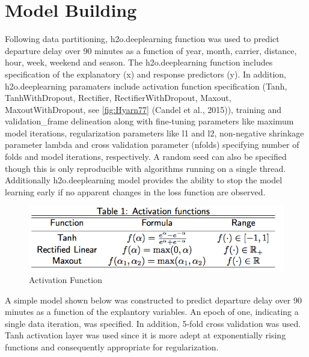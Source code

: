 \documentclass[12pt,twoside]{amherstthesis}
\begin{document}
  \clearpage 
  
  \section{Model Building}\label{model-building}
  
  Following data partitioning, h2o.deeplearning function was used to
  predict departure delay over 90 minutes as a function of year, month,
  carrier, distance, hour, week, weekend and season. The h2o.deeplearning
  function includes specification of the explanatory (x) and response
  predictors (y). In addition, h2o.deeplearning paramaters include
  activation function specification (Tanh, TanhWithDropout, Rectifier,
  RectifierWithDropout, Maxout, MaxoutWithDropout, see
  \autoref{fig:Hyarn77} (Candel et al., 2015)), training and
  validation\_frame delineation along with fine-tuning parameters like
  maximum model iterations, regularization parameters like l1 and l2,
  non-negative shrinkage parameter lambda and cross validation parameter
  (nfolds) specifying number of folds and model iterations, respectively.
  A random seed can also be specified though this is only reproducible
  with algorithms running on a single thread. Additionally
  h2o.deeplearning model provides the ability to stop the model learning
  early if no apparent changes in the loss function are observed.
  
  \begin{figure}[htbp]
  \centering
  \includegraphics[scale = 0.5,angle = 0]{figure/activationFunc.png}
  \caption[Activation Function]{\normalsize{Activation Function}}
  \label{fig:Hyarn77}
  \end{figure}
  
  A simple model shown below was constructed to predict departure delay
  over 90 minutes as a function of the explantory variables. An epoch of
  one, indicating a single data iteration, was specified. In addition,
  5-fold cross validation was used. Tanh activation layer was used since
  it is more adept at exponentially rising functions and consequently
  appropriate for regularization.
  
\end{document}
